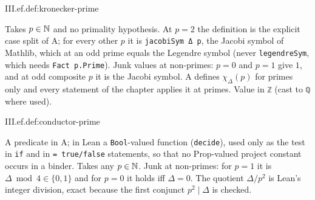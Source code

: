 \begin{definition}
\end{definition}
\begin{tfformal}{III.ef.def:kronecker-prime}
\begin{tffidelity}
Takes $p\in\mathbb{N}$ and no primality hypothesis. At $p=2$ the definition is the explicit case split of A; for every other $p$ it is \texttt{jacobiSym Δ p}, the Jacobi symbol of Mathlib, which at an odd prime equals the Legendre symbol (never \texttt{legendreSym}, which needs \texttt{Fact p.Prime}). Junk values at non-primes: $p=0$ and $p=1$ give $1$, and at odd composite $p$ it is the Jacobi symbol. A defines $\chi_\Delta(p)$ for primes only and every statement of the chapter applies it at primes. Value in \texttt{ℤ} (cast to \texttt{ℚ} where used).
\end{tffidelity}
\end{tfformal}

\begin{definition}
\end{definition}
\begin{tfformal}{III.ef.def:conductor-prime}
\begin{tffidelity}
A predicate in A; in Lean a \texttt{Bool}-valued function (\texttt{decide}), used only as the test in \texttt{if} and in \texttt{= true/false} statements, so that no Prop-valued project constant occurs in a binder. Takes any $p\in\mathbb{N}$. Junk at non-primes: for $p=1$ it is $\Delta\bmod4\in\{0,1\}$ and for $p=0$ it holds iff $\Delta=0$. The quotient $\Delta/p^2$ is Lean's integer division, exact because the first conjunct $p^2\mid\Delta$ is checked.
\end{tffidelity}
\end{tfformal}

